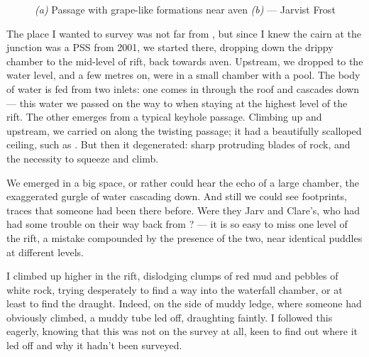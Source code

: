 \begin{figure*}[t!]
	\checkoddpage \ifoddpage \forcerectofloat \else \forceversofloat \fi
	\centering
	\begin{subfigure}[t]{0.328\textwidth}
		\centering
		 \caption{}\label{povezava formation}
	\end{subfigure}
  	 \hfill
   	 \begin{subfigure}[t]{0.662\textwidth}
        		\centering
        		\caption{} \label{mary cafe tanguy}
        \end{subfigure}
	\caption{
	 	  \textit{(a)} Passage with grape-like formations near \protect{} aven
   		 \textit{(b)} \protect{} --- Jarvist Frost}
\end{figure*}
	


	The place I wanted to survey was not far from , but since I knew the cairn at the junction was a PSS from 2001, we started there, dropping down the drippy chamber to the mid-level of rift, back towards  aven. Upstream, we dropped to the water level, and a few metres on, were in a small chamber with a pool. The body of water is fed from two inlets: one comes in through the roof and cascades down --- this water we passed on the way to  when staying at the highest level of the rift. The other emerges from a typical keyhole passage. Climbing up and upstream, we carried on along the twisting passage; it had a beautifully scalloped ceiling, such as . But then it degenerated: sharp protruding blades of rock, and the necessity to squeeze and climb. 
	
	We emerged in a big space, or rather could hear the echo of a large chamber, the exaggerated gurgle of water cascading down. And still we could see footprints, traces that someone had been there before. Were they Jarv and Clare's, who had had some trouble on their way back from ? --- it is so easy to miss one level of the rift, a mistake compounded by the presence of the two, near identical puddles at different levels. 
	

	
	I climbed up higher in the rift, dislodging clumps of red mud and pebbles of white rock, trying desperately to find a way into the waterfall chamber, or at least to find the draught. Indeed, on the side of muddy ledge, where someone had obviously climbed, a muddy tube led off, draughting faintly. I followed this eagerly, knowing that this was not on the survey at all, keen to find out where it led off and why it hadn't been surveyed. 

